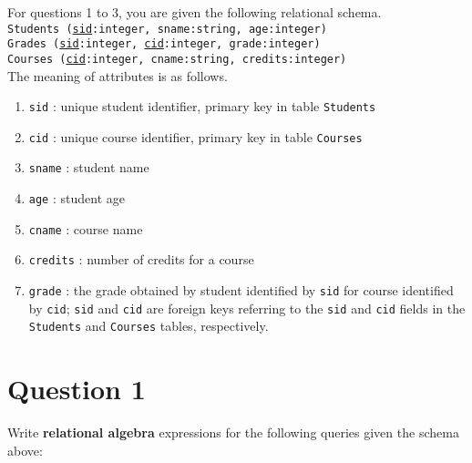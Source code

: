 
For questions 1 to 3, you are given the following relational schema.\\

\texttt{Students (\underline{sid}:integer, sname:string, age:integer)}\\
\texttt{Grades (\underline{sid}:integer, \underline{cid}:integer, grade:integer)}\\
\texttt{Courses (\underline{cid}:integer, cname:string, credits:integer)}\\

The meaning of attributes is as follows.

\begin{enumerate}[topsep=0pt,itemsep=0ex,partopsep=5pt,parsep=0pt,label=-]
\item \texttt{sid} : unique student identifier, primary key in table \texttt{Students}
\item \texttt{cid} : unique course identifier, primary key in table \texttt{Courses}
\item \texttt{sname} : student name
\item \texttt{age} : student age
\item \texttt{cname} : course name
\item \texttt{credits} : number of credits for a course
\item \texttt{grade} : the grade obtained by student identified by \texttt{sid} for course identified by \texttt{cid}; \texttt{sid} and \texttt{cid} are foreign keys referring to the \texttt{sid} and \texttt{cid} fields in the \texttt{Students} and \texttt{Courses} tables, respectively.
\end{enumerate}

\section*{Question 1}

Write \textbf{relational algebra} expressions for the following queries given the schema above:

